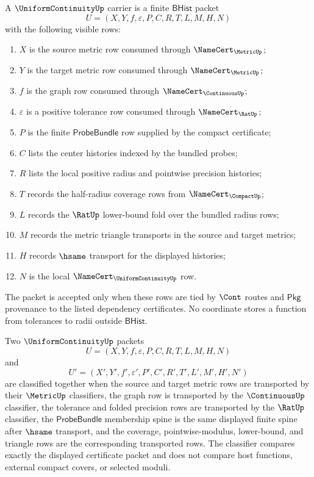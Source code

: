 \begin{definition}
\label{def:uniform-continuity-bhist-carrier}
A $\UniformContinuityUp$ carrier is a finite $\mathsf{BHist}$ packet
$$
U=(X,Y,f,\varepsilon,P,C,R,T,L,M,H,N)
$$
with the following visible rows:
\begin{enumerate}
\item $X$ is the source metric row consumed through $\NameCert_{\MetricUp}$;
\item $Y$ is the target metric row consumed through $\NameCert_{\MetricUp}$;
\item $f$ is the graph row consumed through $\NameCert_{\ContinuousUp}$;
\item $\varepsilon$ is a positive tolerance row consumed through $\NameCert_{\RatUp}$;
\item $P$ is the finite $\mathsf{ProbeBundle}$ row supplied by the compact certificate;
\item $C$ lists the center histories indexed by the bundled probes;
\item $R$ lists the local positive radius and pointwise precision histories;
\item $T$ records the half-radius coverage rows from $\NameCert_{\CompactUp}$;
\item $L$ records the $\RatUp$ lower-bound fold over the bundled radius rows;
\item $M$ records the metric triangle transports in the source and target metrics;
\item $H$ records $\hsame$ transport for the displayed histories;
\item $N$ is the local $\NameCert_{\UniformContinuityUp}$ row.
\end{enumerate}
The packet is accepted only when these rows are tied by $\Cont$ routes and
$\mathsf{Pkg}$ provenance to the listed dependency certificates. No coordinate
stores a function from tolerances to radii outside $\mathsf{BHist}$.
\end{definition}

\begin{definition}
\label{def:uniform-continuity-classifier}
Two $\UniformContinuityUp$ packets
$$
U=(X,Y,f,\varepsilon,P,C,R,T,L,M,H,N)
$$
and
$$
U'=(X',Y',f',\varepsilon',P',C',R',T',L',M',H',N')
$$
are classified together when the source and target metric rows are transported
by their $\MetricUp$ classifiers, the graph row is transported by the
$\ContinuousUp$ classifier, the tolerance and folded precision rows are
transported by the $\RatUp$ classifier, the $\mathsf{ProbeBundle}$ membership
spine is the same displayed finite spine after $\hsame$ transport, and the
coverage, pointwise-modulus, lower-bound, and triangle rows are the
corresponding transported rows. The classifier compares exactly the displayed
certificate packet and does not compare host functions, external compact
covers, or selected moduli.
\end{definition}

